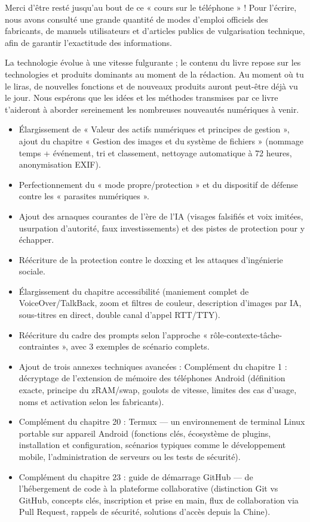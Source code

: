 
Merci d'être resté jusqu'au bout de ce « cours sur le téléphone » ! Pour l'écrire, nous avons consulté une grande quantité de modes d'emploi officiels des fabricants, de manuels utilisateurs et d'articles publics de vulgarisation technique, afin de garantir l'exactitude des informations.

La technologie évolue à une vitesse fulgurante ; le contenu du livre repose sur les technologies et produits dominants au moment de la rédaction. Au moment où tu le liras, de nouvelles fonctions et de nouveaux produits auront peut-être déjà vu le jour. Nous espérons que les idées et les méthodes transmises par ce livre t'aideront à aborder sereinement les nombreuses nouveautés numériques à venir.


\begin{itemize}
  \item Élargissement de « Valeur des actifs numériques et principes de gestion », ajout du chapitre « Gestion des images et du système de fichiers » (nommage temps + événement, tri et classement, nettoyage automatique à 72 heures, anonymisation EXIF).
  \item Perfectionnement du « mode propre/protection » et du dispositif de défense contre les « parasites numériques ».
  \item Ajout des arnaques courantes de l'ère de l'IA (visages falsifiés et voix imitées, usurpation d'autorité, faux investissements) et des pistes de protection pour y échapper.
  \item Réécriture de la protection contre le doxxing et les attaques d'ingénierie sociale.
  \item Élargissement du chapitre accessibilité (maniement complet de VoiceOver/TalkBack, zoom et filtres de couleur, description d'images par IA, sous-titres en direct, double canal d'appel RTT/TTY).
  \item Réécriture du cadre des prompts selon l'approche « rôle-contexte-tâche-contraintes », avec 3 exemples de scénario complets.
  \item Ajout de trois annexes techniques avancées : Complément du chapitre 1 : décryptage de l'extension de mémoire des téléphones Android (définition exacte, principe du zRAM/swap, goulots de vitesse, limites des cas d'usage, noms et activation selon les fabricants).
  \item Complément du chapitre 20 : Termux — un environnement de terminal Linux portable sur appareil Android (fonctions clés, écosystème de plugins, installation et configuration, scénarios typiques comme le développement mobile, l'administration de serveurs ou les tests de sécurité).
  \item Complément du chapitre 23 : guide de démarrage GitHub — de l'hébergement de code à la plateforme collaborative (distinction Git vs GitHub, concepts clés, inscription et prise en main, flux de collaboration via Pull Request, rappels de sécurité, solutions d'accès depuis la Chine).
\end{itemize}

